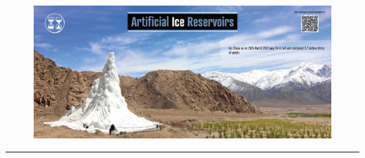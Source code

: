 %
\begin{titlepage}
	\flushright
	\hfill
	\vfill

  \begin{figure}[htb]
  \centering
  \includegraphics[width=\textwidth]{figs/AIR_title.jpg}
  \end{figure}
	{\Large\thesisTitle \par}
	\rule[5pt]{\textwidth}{.4pt} \par
	{\large\thesisName}
	\vfill
	\textit{\large\thesisDate} \\
\end{titlepage}


